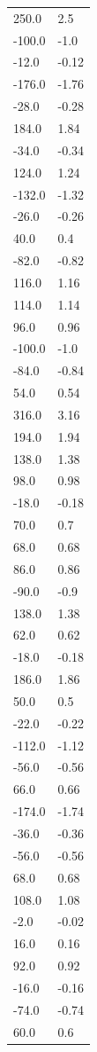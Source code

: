\begin{longtable}{ll}
250.0 & 2.5 \\
-100.0 & -1.0 \\
-12.0 & -0.12 \\
-176.0 & -1.76 \\
-28.0 & -0.28 \\
184.0 & 1.84 \\
-34.0 & -0.34 \\
124.0 & 1.24 \\
-132.0 & -1.32 \\
-26.0 & -0.26 \\
40.0 & 0.4 \\
-82.0 & -0.82 \\
116.0 & 1.16 \\
114.0 & 1.14 \\
96.0 & 0.96 \\
-100.0 & -1.0 \\
-84.0 & -0.84 \\
54.0 & 0.54 \\
316.0 & 3.16 \\
194.0 & 1.94 \\
138.0 & 1.38 \\
98.0 & 0.98 \\
-18.0 & -0.18 \\
70.0 & 0.7 \\
68.0 & 0.68 \\
86.0 & 0.86 \\
-90.0 & -0.9 \\
138.0 & 1.38 \\
62.0 & 0.62 \\
-18.0 & -0.18 \\
186.0 & 1.86 \\
50.0 & 0.5 \\
-22.0 & -0.22 \\
-112.0 & -1.12 \\
-56.0 & -0.56 \\
66.0 & 0.66 \\
-174.0 & -1.74 \\
-36.0 & -0.36 \\
-56.0 & -0.56 \\
68.0 & 0.68 \\
108.0 & 1.08 \\
-2.0 & -0.02 \\
16.0 & 0.16 \\
92.0 & 0.92 \\
-16.0 & -0.16 \\
-74.0 & -0.74 \\
60.0 & 0.6 \\

\end{longtable}
